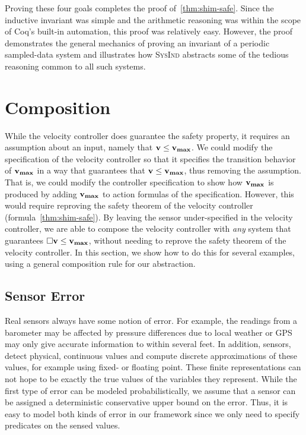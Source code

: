 Proving these four goals completes the proof
of~\eqref{thm:shim-safe}. Since the inductive invariant was simple and the
arithmetic reasoning was within the scope of Coq's built-in automation,
this proof was relatively easy. However, the proof demonstrates the general
mechanics of proving an invariant of a periodic sampled-data system and
illustrates how \textsc{SysInd} abstracts some of the tedious reasoning
common to all such systems.

\section{Composition}
\label{sec:memo15-composition}
While the velocity controller does guarantee the safety property, it
requires an assumption about an input, namely that $\mathbf{v} \leq \mathbf{v_{max}}$.  We
could modify the specification of the velocity controller so that it
specifies the transition behavior of $\mathbf{v_{max}}$ in a way that guarantees that
$\mathbf{v} \leq \mathbf{v_{max}}$, thus removing the assumption.  That is, we could modify
the controller specification to show how $\mathbf{v_{max}}$ is produced by adding
$\mathbf{v_{max}}$ to action formulas of the specification.  However, this would
require reproving the safety theorem of the velocity controller
(formula~\eqref{thm:shim-safe}).  By leaving the sensor under-specified in
the velocity controller, we are able to compose the velocity controller
with \emph{any} system that guarantees $\Box{} \mathbf{v} \leq \mathbf{v_{max}}$, without
needing to reprove the safety theorem of the velocity controller.  In this
section, we show how to do this for several examples, using a general
composition rule for our \SysA{} abstraction.

\subsection{Sensor Error}
Real sensors always have some notion of error.  For example, the readings
from a barometer may be affected by pressure differences due to local
weather or GPS may only give accurate information to within several feet.
In addition, sensors, detect physical, continuous values and compute
discrete approximations of these values, for example using fixed- or
floating point.  These finite representations can not hope to be exactly
the true values of the variables they represent.  While the first type of
error can be modeled probabilistically, we assume that a sensor can be
assigned a deterministic conservative upper bound on the error. Thus, it is
easy to model both kinds of error in our framework since we only need to
specify predicates on the sensed values.

